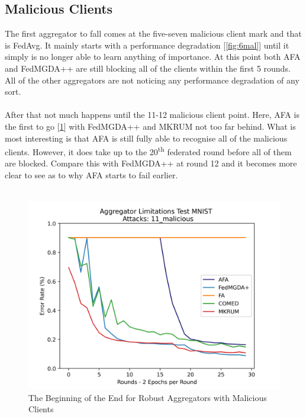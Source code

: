 \subsection{Malicious Clients}
The first aggregator to fall comes at the five-seven malicious client mark and that is FedAvg.
It mainly starts with a performance degradation [\ref{fig:6mal}] until it simply is no longer able to learn anything of importance.
At this point both AFA and FedMGDA++ are still blocking all of the clients within the first 5 rounds.
All of the other aggregators are not noticing any performance degradation of any sort.
\\ \\
After that not much happens until the 11-12 malicious client point.
Here, AFA is the first to go [\ref{fig:11mal}] with FedMGDA++ and MKRUM not too far behind.
What is most interesting is that AFA is still fully able to recognise all of the malicious clients.
However, it does take up to the 20\textsuperscript{th} federated round before all of them are blocked.
Compare this with FedMGDA++ at round 12 and it becomes more clear to see as to why AFA starts to fail earlier.
\\ \\
\begin{figure}[htbp]
	\centering
    \includegraphics[scale=0.7]{initial/graphs/11_malicious.png}
	\caption{The Beginning of the End for Robust Aggregators with Malicious Clients}
	\label{fig:11mal}
\end{figure}

